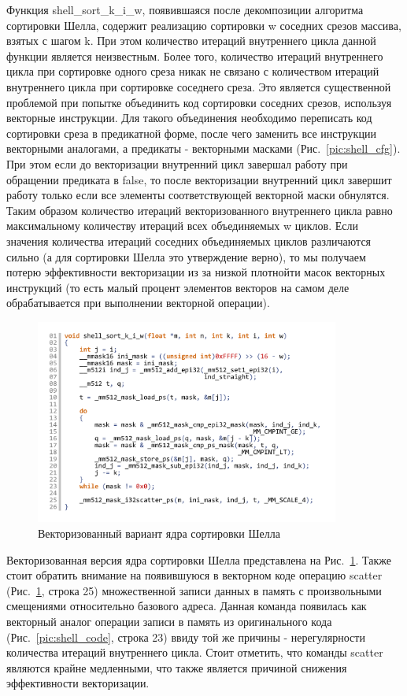 \documentclass[utf8]{psta}
\begin{document}
Функция shell\_sort\_k\_i\_w, появившаяся после декомпозиции алгоритма сортировки Шелла, содержит реализацию сортировки w соседних срезов массива, взятых с шагом k. При этом количество итераций внутреннего цикла данной функции является неизвестным. Более того, количество итераций внутреннего цикла при сортировке одного среза никак не связано с количеством итераций внутреннего цикла при сортировке соседнего среза. Это является существенной проблемой при попытке объединить код сортировки соседних срезов, используя векторные инструкции. Для такого объединения необходимо переписать код сортировки среза в предикатной форме, после чего заменить все инструкции векторными аналогами, а предикаты - векторными масками (Рис.~\ref{pic:shell_cfg}). При этом если до векторизации внутренний цикл завершал работу при обращении предиката в false, то после векторизации внутренний цикл завершит работу только если все элементы соответствующей векторной маски обнулятся. Таким образом количество итераций векторизованного внутреннего цикла равно максимальному количеству итераций всех объединяемых w циклов. Если значения количества итераций соседних объединяемых циклов различаются сильно (а для сортировки Шелла это утверждение верно), то мы получаем потерю эффективности векторизации из за низкой плотнойти масок векторных инструкций (то есть малый процент элементов векторов на самом деле обрабатывается при выполнении векторной операции).

\begin{figure}
\includegraphics[width=10cm]{pics/pic_shell_code_vect}
\caption{Векторизованный вариант ядра сортировки Шелла}
\label{pic:shell_code_vect}
\end{figure}

Векторизованная версия ядра сортировки Шелла представлена на Рис.~\ref{pic:shell_code_vect}. Также стоит обратить внимание на появившуюся в векторном коде операцию scatter (Рис.~\ref{pic:shell_code_vect}, строка 25) множественной записи данных в память с произвольными смещениями относительно базового адреса. Данная команда появилась как векторный аналог операции записи в память из оригинального кода (Рис.~\ref{pic:shell_code}, строка 23) ввиду той же причины - нерегулярности количества итераций внутреннего цикла. Стоит отметить, что команды scatter являются крайне медленными, что также является причиной снижения эффективности векторизации.
\end{document}
